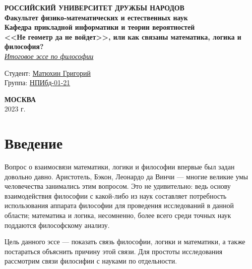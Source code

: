 \documentclass[a4page]{article}
\begin{document}
\begin{titlepage}
	\begin{center}
		\hfill \break
		\textbf{
			\large{РОССИЙСКИЙ УНИВЕРСИТЕТ ДРУЖБЫ НАРОДОВ}\\
			\normalsize{Факультет физико-математических и естественных наук}\\
			\normalsize{Кафедра прикладной информатики и теории вероятностей}\\
		}
		\vspace*{\fill}
		\Large{\textbf{<<Не геометр да не войдет>>, или как связаны математика, логика и философия?}}
		\\
		\underline{\textit{\normalsize{Итоговое эссе по философии}}}
		\vspace*{\fill}

	\end{center}

	\begin{flushright}
		Студент: \underline{Матюхин Григорий}\\ \vspace{0.5cm}
		Группа: \underline{НПИбд-01-21}
	\end{flushright}

	\begin{center} \textbf{МОСКВА} \\ 2023 г. \end{center}
	\thispagestyle{empty}

\end{titlepage}

\newpage

\tableofcontents

\newpage

\section{Введение}
Вопрос о взаимосвязи математики, логики и философии впервые был задан довольно давно.
Аристотель, Бэкон, Леонардо да Винчи --- многие великие умы человечества занимались этим вопросом.
Это не удивительно: ведь основу взаимодействия философии с какой-либо из наук
составляет потребность использования аппарата философии для проведения исследований в данной области;
математика и логика, несомненно, более всего среди точных наук поддаются философскому анализу.

Цель данного эссе --- показать связь философии, логики и математики,
а также постараться объяснить причину этой связи.
Для простоты исследования рассмотрим связи филосифии с науками по отдельности.
\end{document}
